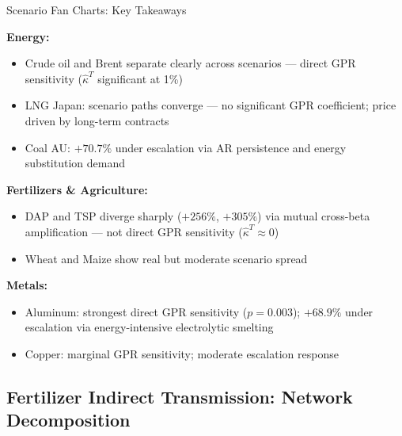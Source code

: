 ﻿\documentclass[aspectratio=1610]{beamer}
\begin{document}
\begin{frame}[shrink=10]{Scenario Fan Charts: Key Takeaways}

  \textbf{Energy:}
  \begin{itemize}
    \item Crude oil and Brent separate clearly across scenarios
          --- direct GPR sensitivity ($\hat{\kappa}^T$ significant at 1\%)
    \item LNG Japan: scenario paths converge --- no significant GPR coefficient;
          price driven by long-term contracts
    \item Coal AU: $+70.7\%$ under escalation via AR persistence and energy
          substitution demand
  \end{itemize}

  \medskip

  \textbf{Fertilizers \& Agriculture:}
  \begin{itemize}
    \item DAP and TSP diverge sharply ($+256\%$, $+305\%$) via mutual cross-beta
          amplification --- not direct GPR sensitivity ($\hat{\kappa}^T \approx 0$)
    \item Wheat and Maize show real but moderate scenario spread
  \end{itemize}

  \medskip

  \textbf{Metals:}
  \begin{itemize}
    \item Aluminum: strongest direct GPR sensitivity ($p = 0.003$); $+68.9\%$
          under escalation via energy-intensive electrolytic smelting
    \item Copper: marginal GPR sensitivity; moderate escalation response
  \end{itemize}

\end{frame}

\subsection{Fertilizer Indirect Transmission: Network Decomposition}
\end{document}
